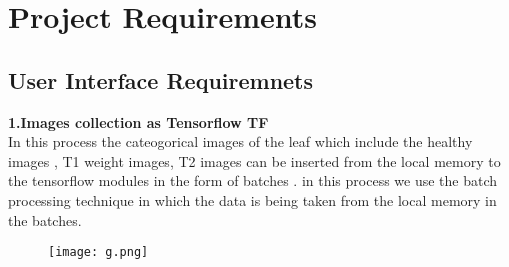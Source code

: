 \documentclass{article}
\begin{document}
\section{\textbf{Project Requirements}}

\subsection{User Interface Requiremnets }


    \textbf{1.Images collection as Tensorflow TF}\\
In this process the cateogorical images of the leaf which include the healthy images , T1 weight
images, T2 images can be inserted from the local memory to the tensorflow modules in the form of
batches . in this process we use the batch processing technique in which the data is being taken from
the local memory in the batches. \begin{figure}[h]
            \centering
            \texttt{[image: g.png]}
        \end{figure}
    
\end{document}
